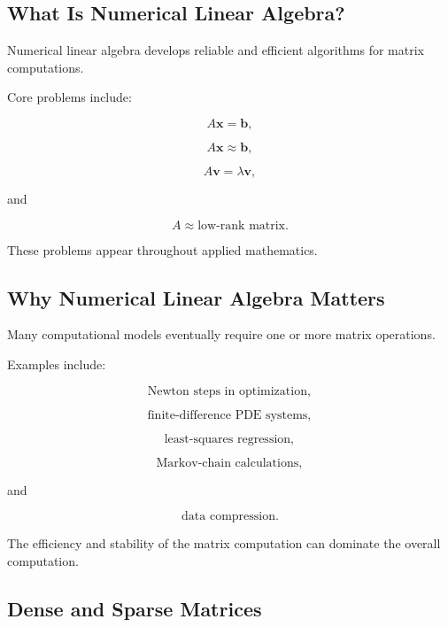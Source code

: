 \subsection{What Is Numerical Linear Algebra?}
\label{subsec:what-is-numerical-linear-algebra}

Numerical linear algebra develops reliable and efficient algorithms for
matrix computations.

Core problems include:

\[
\boxed{
A\mathbf{x}
=
\mathbf{b},
}
\]

\[
\boxed{
A\mathbf{x}
\approx
\mathbf{b},
}
\]

\[
\boxed{
A\mathbf{v}
=
\lambda\mathbf{v},
}
\]

and

\[
\boxed{
A
\approx
\text{low-rank matrix}.
}
\]

These problems appear throughout applied mathematics.

\subsection{Why Numerical Linear Algebra Matters}
\label{subsec:why-numerical-linear-algebra-matters}

Many computational models eventually require one or more matrix
operations.

Examples include:

\[
\boxed{
\text{Newton steps in optimization},
}
\]

\[
\boxed{
\text{finite-difference PDE systems},
}
\]

\[
\boxed{
\text{least-squares regression},
}
\]

\[
\boxed{
\text{Markov-chain calculations},
}
\]

and

\[
\boxed{
\text{data compression}.
}
\]

The efficiency and stability of the matrix computation can dominate the
overall computation.

\subsection{Dense and Sparse Matrices}
\label{subsec:dense-sparse-matrices}

